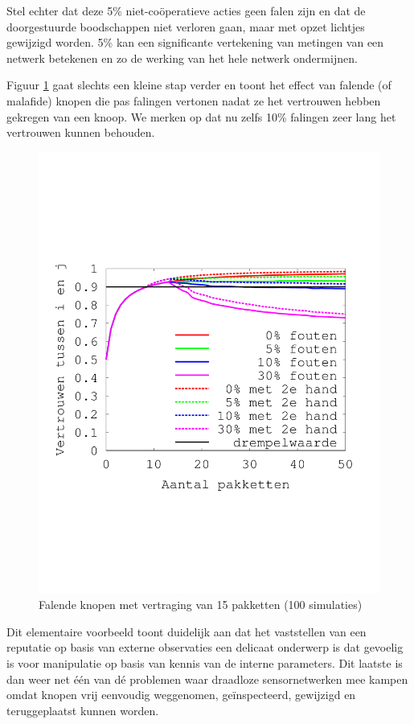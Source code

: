 Stel echter dat deze 5\% niet-co\"operatieve acties geen falen zijn en dat de
doorgestuurde boodschappen niet verloren gaan, maar met opzet lichtjes
gewijzigd worden. 5\% kan een significante vertekening van metingen van een
netwerk betekenen en zo de werking van het hele netwerk ondermijnen.

Figuur \ref{fig:reputation-malicious} gaat slechts een kleine stap verder en
toont het effect van falende (of malafide) knopen die pas falingen vertonen
nadat ze het vertrouwen hebben gekregen van een knoop. We merken op dat nu zelfs
10\% falingen zeer lang het vertrouwen kunnen behouden.

\begin{figure}[ht]
 \centering
 \includegraphics[width=.6\linewidth]{./resources/reputation-malicious.pdf}
 \caption{Falende knopen met vertraging van 15 pakketten (100 simulaties)}
 \label{fig:reputation-malicious}
\end{figure}

Dit elementaire voorbeeld toont duidelijk aan dat het vaststellen van een
reputatie op basis van externe observaties een delicaat onderwerp is dat
gevoelig is voor manipulatie op basis van kennis van de interne parameters. Dit
laatste is dan weer net \'e\'en van d\'e problemen waar draadloze
sensornetwerken mee kampen omdat knopen vrij eenvoudig weggenomen,
ge\"inspecteerd, gewijzigd en teruggeplaatst kunnen worden.
